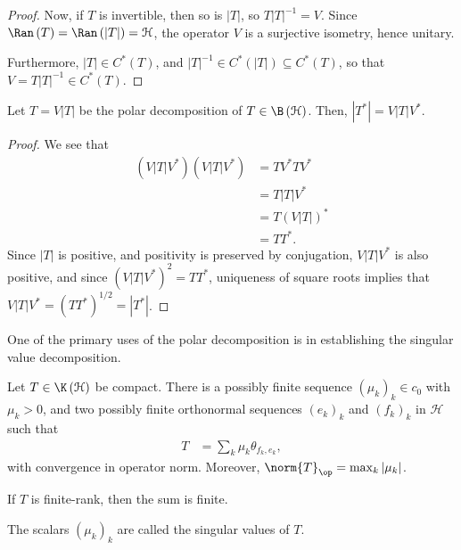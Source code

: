 \documentclass[10pt]{mypackage}
\begin{document}
\begin{proof}
  Now, if $T$ is invertible, then so is $\left\vert T \right\vert$, so $T\left\vert T \right\vert^{-1} = V$. Since $\Ran\left( T \right) = \Ran\left( \left\vert T \right\vert \right) = \mathcal{H}$, the operator $V$ is a surjective isometry, hence unitary.\newline

  Furthermore, $\left\vert T \right\vert\in C^{\ast}\left( T \right)$, and $\left\vert T \right\vert^{-1}\in C^{\ast}\left( \left\vert T \right\vert \right)\subseteq C^{\ast}\left( T \right)$, so that $V = T\left\vert T \right\vert^{-1}\in C^{\ast}\left( T \right)$.
\end{proof}
\begin{fact}
  Let $T = V\left\vert T \right\vert$ be the polar decomposition of $T\in \B\left( \mathcal{H} \right)$. Then, $\left\vert T^{\ast} \right\vert = V\left\vert T \right\vert V^{\ast}$.
\end{fact}
\begin{proof}
  We see that
  \begin{align*}
    \left( V\left\vert T \right\vert V^{\ast} \right)\left( V \left\vert T \right\vert V^{\ast} \right) &= TV^{\ast}TV^{\ast}\\
                                                                                                        &= T\left\vert T \right\vert V^{\ast}\\
                                                                                                        &= T\left( V\left\vert T \right\vert \right)^{\ast}\\
                                                                                                        &= TT^{\ast}.
  \end{align*}
  Since $\left\vert T \right\vert$ is positive, and positivity is preserved by conjugation, $V\left\vert T \right\vert V^{\ast}$ is also positive, and since $\left( V\left\vert T \right\vert V^{\ast} \right)^2 = TT^{\ast}$, uniqueness of square roots implies that $V \left\vert T \right\vert V^{\ast} = \left( TT^{\ast} \right)^{1/2} = \left\vert T^{\ast} \right\vert$.
\end{proof}
One of the primary uses of the polar decomposition is in establishing the singular value decomposition.
\begin{proposition}
  Let $T \in\K\left( \mathcal{H} \right)$ be compact. There is a possibly finite sequence $\left( \mu_k \right)_k\in c_0$ with $\mu_k > 0$, and two possibly finite orthonormal sequences $\left( e_k \right)_k$ and $\left( f_k \right)_k$ in $\mathcal{H}$ such that
  \begin{align*}
    T &= \sum_{k}\mu_k\theta_{f_k,e_k},
  \end{align*}
  with convergence in operator norm. Moreover, $\norm{T}_{\op} = \max_{k}\left\vert \mu_k \right\vert$.\newline

  If $T$ is finite-rank, then the sum is finite.\newline

  The scalars $\left( \mu_k \right)_k$ are called the singular values of $T$.
\end{proposition}
\end{document}

